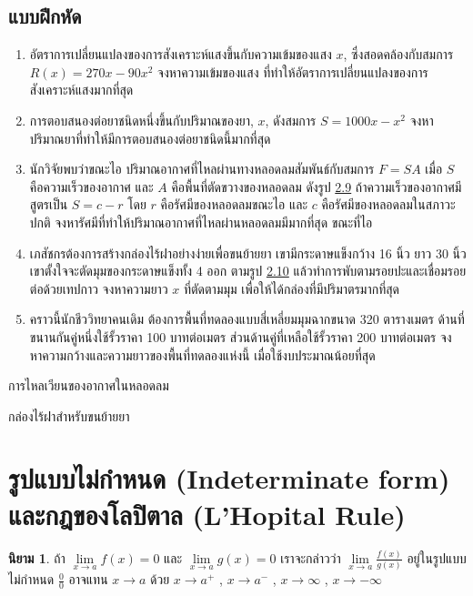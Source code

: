 \documentclass[
]{book}
\theoremstyle{definition}
\newtheorem{definition}{นิยาม}[chapter]
\theoremstyle{definition}
\theoremstyle{definition}
\theoremstyle{definition}
\theoremstyle{remark}
\begin{document}
\subsection{แบบฝึกหัด}\label{uxe41uxe1auxe1auxe1duxe01uxe2buxe14-6}

\begin{enumerate}
\def\labelenumi{\arabic{enumi}.}
\item
  อัตราการเปลี่ยนแปลงของการสังเคราะห์แสงขึ้นกับความเข้มของแสง \(x\),
  ซึ่งสอดคล้องกับสมการ \(R(x)=270x-90x^2\) จงหาความเข้มของแสง
  ที่ทำให้อัตราการเปลี่ยนแปลงของการสังเคราะห์แสงมากที่สุด
\item
  การตอบสนองต่อยาชนิดหนึ่งขึ้นกับปริมาณของยา, \(x\), ดังสมการ \(S=1000x-x^2\)
  จงหาปริมาณยาที่ทำให้มีการตอบสนองต่อยาชนิดนี้มากที่สุด
\item
  นักวิจัยพบว่าขณะไอ ปริมาณอากาศที่ไหลผ่านทางหลอดลมสัมพันธ์กับสมการ \(F=SA\) เมื่อ \(S\)
  คือความเร็วของอากาศ และ \(A\) คือพื้นที่ตัดขวางของหลอดลม ดังรูป
  \hyperref[fig-artery]{2.9}
  ถ้าความเร็วของอากาศมีสูตรเป็น \(S=c-r\) โดย \(r\) คือรัศมีของหลอดลมขณะไอ และ \(c\)
  คือรัศมีของหลอดลมในสภาวะปกติ จงหารัศมีที่ทำให้ปริมาณอากาศที่ไหลผ่านหลอดลมมีมากที่สุด
  ขณะที่ไอ
\item
  เภสัชกรต้องการสร้างกล่องไร้ฝาอย่างง่ายเพื่อขนย้ายยา เขามีกระดาษแข็งกว้าง 16 นิ้ว
  ยาว 30 นิ้ว เขาตั้งใจจะตัดมุมของกระดาษแข็งทั้ง 4 ออก ตามรูป
  \hyperref[fig-box-area]{2.10}
  แล้วทำการพับตามรอยปะและเชื่อมรอยต่อด้วยเทปกาว จงหาความยาว \(x\) ที่ตัดตามมุม
  เพื่อให้ได้กล่องที่มีปริมาตรมากที่สุด
\item
  คราวนี้นักชีววิทยาคนเดิม ต้องการพื้นที่ทดลองแบบสี่เหลี่ยมมุมฉากขนาด 320 ตารางเมตร
  ด้านที่ขนานกันคู่หนึ่งใช้รั้วราคา 100 บาทต่อเมตร ส่วนด้านคู่ที่เหลือใช้รั้วราคา 200
  บาทต่อเมตร จงหาความกว้างและความยาวของพื้นที่ทดลองแห่งนี้ เมื่อใช้งบประมาณน้อยที่สุด
\end{enumerate}

การไหลเวียนของอากาศในหลอดลม

กล่องไร้ฝาสำหรับขนย้ายยา

\section{รูปแบบไม่กำหนด (Indeterminate form) และกฎของโลปิตาล (L'Hopital Rule)}\label{uxe23uxe1buxe41uxe1auxe1auxe44uxe21uxe01uxe33uxe2buxe19uxe14-indeterminate-form-uxe41uxe25uxe30uxe01uxe0euxe02uxe2duxe07uxe42uxe25uxe1buxe15uxe32uxe25-lhopital-rule}

\begin{definition}
ถ้า \(\mathop {\lim }\limits_{x\to a} f(x)=0\) และ \(\displaystyle \mathop
{\lim
}\limits_{x\to a} g(x)=0\) เราจะกล่าวว่า \(\displaystyle \mathop {\lim
}\limits_{x\to a}
\frac{f(x)}{g(x)}\) อยู่ในรูปแบบไม่กำหนด \(\displaystyle \frac{0}{0}\) อาจแทน
\(x\to a\) ด้วย \(x\to a^+\) , \(x\to a^-\) , \(x\to \infty\) , \(x\to -\infty\)
\end{definition}
\end{document}
